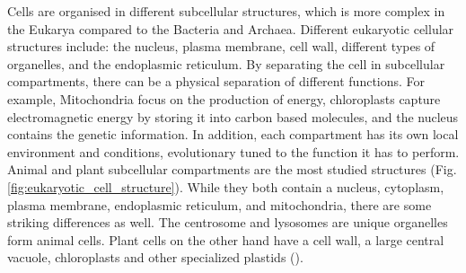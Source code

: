 Cells are organised in different subcellular structures,
which is more complex in the Eukarya compared to the Bacteria and Archaea.
Different eukaryotic cellular structures include:
the nucleus,
plasma membrane,
cell wall,
different types of organelles,
and the endoplasmic reticulum.
By separating the cell in subcellular compartments, 
there can be a physical separation of different functions.
For example,
Mitochondria focus on the production of energy,
chloroplasts capture electromagnetic energy  by storing it into carbon based molecules,
and the nucleus contains the genetic information.
In addition, each compartment has its own local environment and conditions,
evolutionary tuned to the function it has to perform.
Animal and plant subcellular compartments are the most studied structures (Fig. \ref{fig:eukaryotic_cell_structure}).
While they both contain 
a nucleus, 
cytoplasm,
plasma membrane, 
endoplasmic reticulum,
and mitochondria,
there are some striking differences as well. 
The centrosome and lysosomes are unique organelles form animal cells. 
Plant cells on the other hand have a 
cell wall, 
a large central vacuole, 
chloroplasts and other specialized plastids
(\cite{boundless_biology_eukaryotic}).

